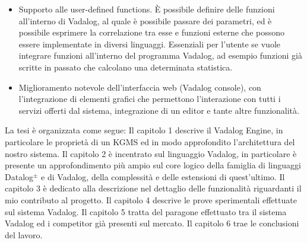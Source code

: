 \begin{itemize}
	\item Supporto alle user-defined functions. È possibile definire delle funzioni all'interno di Vadalog, al quale è possibile passare dei parametri, ed è possibile esprimere la correlazione tra esse e funzioni esterne che possono essere implementate in diversi linguaggi. Essenziali per l'utente se vuole integrare funzioni all'interno del programma Vadalog, ad esempio funzioni già scritte in passato che calcolano una determinata statistica.
	\item Miglioramento notevole dell'interfaccia web (Vadalog console), con l'integrazione di elementi grafici che permettono l'interazione con tutti i servizi offerti dal sistema, integrazione di un editor e tante altre funzionalità. \newline
\end{itemize} 
La tesi è organizzata come segue: \newline \newline
Il capitolo 1 descrive il Vadalog Engine, in particolare le proprietà di un KGMS ed in modo approfondito l'architettura del nostro sistema. \newline \newline
Il capitolo 2 è incentrato sul linguaggio Vadalog, in particolare è presente un approfondimento più ampio sul core logico della famiglia di linguaggi Datalog$^\pm$ e di Vadalog, della complessità e delle estensioni di quest'ultimo. \newline \newline
Il capitolo 3 è dedicato alla descrizione nel dettaglio delle funzionalità riguardanti il mio contributo al progetto. \newline \newline
Il capitolo 4 descrive le prove sperimentali effettuate sul sistema Vadalog. \newline \newline
Il capitolo 5 tratta del paragone effettuato tra il sistema Vadalog ed i competitor già presenti sul mercato. \newline \newline
Il capitolo 6 trae le conclusioni del lavoro.
